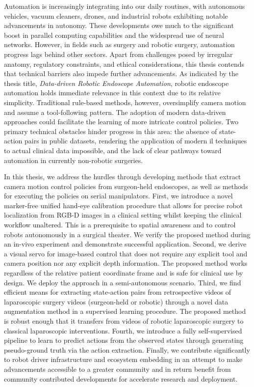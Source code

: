 Automation is increasingly integrating into our daily routines, with autonomous vehicles, vacuum cleaners, drones, and industrial robots exhibiting notable advancements in autonomy. These developments owe much to the significant boost in parallel computing capabilities and the widespread use of neural networks. However, in fields such as surgery and robotic surgery, automation progress lags behind other sectors. Apart from challenges posed by irregular anatomy, regulatory constraints, and ethical considerations, this thesis contends that technical barriers also impede further advancements. As indicated by the thesis title, \textit{Data-driven Robotic Endoscope Automation}, robotic endoscope automation holds immediate relevance in this context due to its relative simplicity. Traditional rule-based methods, however, oversimplify camera motion and assume a tool-following pattern. The adoption of modern data-driven approaches could facilitate the learning of more intricate control policies. Two primary technical obstacles hinder progress in this area: the absence of state-action pairs in public datasets, rendering the application of modern \gls{il} techniques to actual clinical data impossible, and the lack of clear pathways toward automation in currently non-robotic surgeries.

In this thesis, we address the hurdles through developing methods that extract camera motion control policies from surgeon-held endoscopes, as well as methods for executing the policies on serial manipulators. First, we introduce a novel marker-free unified hand-eye calibration procedure that allows for precise robot localization from RGB-D images in a clinical setting whilst keeping the clinical workflow unaltered. This is a prerequisite to spatial awareness and to control robots autonomously in a surgical theater. We verify the proposed method during an in-vivo experiment and demonstrate successful application. Second, we derive a visual servo for image-based control that does not require any explicit tool and camera position nor any explicit depth information. The proposed method works regardless of the relative patient coordinate frame and is safe for clinical use by design. We deploy the approach in a semi-autonomous scenario.
Third, we find efficient means for extracting state-action pairs from retrospective videos of laparoscopic surgery videos (surgeon-held or robotic) through a novel data augmentation method in a supervised learning procedure. The proposed method is
robust enough
that it transfers from videos of robotic laparoscopic surgery to classical laparoscopic interventions. Fourth, we introduce a fully self-supervised pipeline to learn to predict actions from the observed states through generating pseudo-ground truth via the action extraction. Finally, we contribute significantly to robot driver infrastructure and ecosystem embedding in an attempt to make advancements accessible to a greater community and in return benefit from community contributed developments for accelerate research and deployment.

